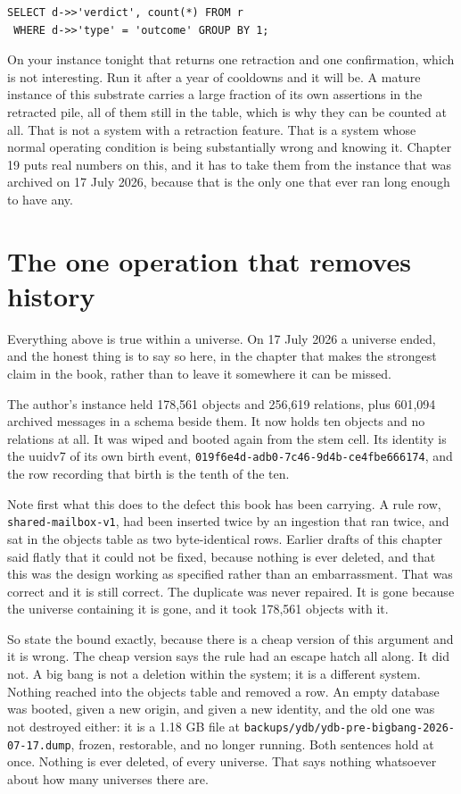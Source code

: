 \begin{verbatim}
SELECT d->>'verdict', count(*) FROM r
 WHERE d->>'type' = 'outcome' GROUP BY 1;
\end{verbatim}

On your instance tonight that returns one retraction and one confirmation, which is not interesting. Run it after a year of cooldowns and it will be. A mature instance of this substrate carries a large fraction of its own assertions in the retracted pile, all of them still in the table, which is why they can be counted at all. That is not a system with a retraction feature. That is a system whose normal operating condition is being substantially wrong and knowing it. Chapter 19 puts real numbers on this, and it has to take them from the instance that was archived on 17 July 2026, because that is the only one that ever ran long enough to have any.

\section{The one operation that removes history}

Everything above is true within a universe. On 17 July 2026 a universe ended, and the honest thing is to say so here, in the chapter that makes the strongest claim in the book, rather than to leave it somewhere it can be missed.

The author's instance held 178,561 objects and 256,619 relations, plus 601,094 archived messages in a schema beside them. It now holds ten objects and no relations at all. It was wiped and booted again from the stem cell. Its identity is the uuidv7 of its own birth event, \texttt{019f6e4d-adb0-7c46-9d4b-ce4fbe666174}, and the row recording that birth is the tenth of the ten.

Note first what this does to the defect this book has been carrying. A rule row, \texttt{shared-mailbox-v1}, had been inserted twice by an ingestion that ran twice, and sat in the objects table as two byte-identical rows. Earlier drafts of this chapter said flatly that it could not be fixed, because nothing is ever deleted, and that this was the design working as specified rather than an embarrassment. That was correct and it is still correct. The duplicate was never repaired. It is gone because the universe containing it is gone, and it took 178,561 objects with it.

So state the bound exactly, because there is a cheap version of this argument and it is wrong. The cheap version says the rule had an escape hatch all along. It did not. A big bang is not a deletion within the system; it is a different system. Nothing reached into the objects table and removed a row. An empty database was booted, given a new origin, and given a new identity, and the old one was not destroyed either: it is a 1.18 GB file at \texttt{backups/ydb/ydb-pre-bigbang-2026-07-17.dump}, frozen, restorable, and no longer running. Both sentences hold at once. Nothing is ever deleted, of every universe. That says nothing whatsoever about how many universes there are.

